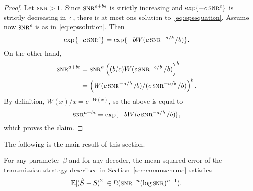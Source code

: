 \begin{proof}
  Let $\snr>1$. Since $\snr^{a+b\e}$ is strictly increasing and
  $\exp\{-c \snr^\e\}$ is strictly decreasing in~$\epsilon$, there is at most one
  solution to~\eqref{eq:epsequation}.  Assume now $\snr^\e$ is as
  in~\eqref{eq:epssolution}. Then
  \begin{equation*}
    \exp\{-c \snr^\e\} = \exp\{-b W(c \snr^{-a/b}/b)\}.
  \end{equation*}
  On the other hand,
  \begin{align*}
    \snr^{a+b\e} &= \snr^a \left( (b/c) W(c\snr^{-a/b}/b) \right)^b \\
    &= \left( W(c\snr^{-a/b}/b) / (c\snr^{-a/b}/b) \right)^b.
  \end{align*}
  By definition, $W(x)/x = e^{-W(x)}$, so the above is equal to
  \begin{equation*}
    \snr^{a+b\e} = \exp\{-bW(c \snr^{-a/b}/b)\},
  \end{equation*}
  which proves the claim.
\end{proof}

The following is the main result of this section.
\begin{theorem}
  \label{thm:scalinglb}
  For any parameter~$\beta$ and for any decoder, the mean squared error of the
  transmission strategy described in Section~\ref{sec:commscheme} satisfies
  \begin{equation*}
    \mse \in \Omega(\snr^{-n}(\log\snr)^{n-1}).
  \end{equation*}
\end{theorem}


